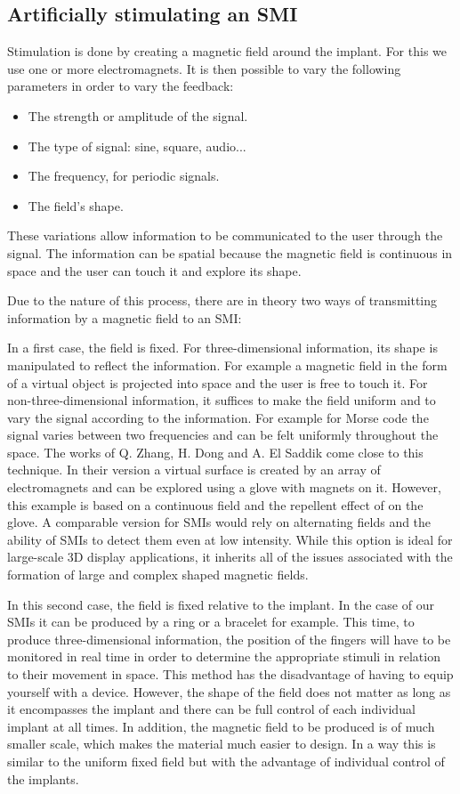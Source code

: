 \documentclass[10pt,journal,compsoc]{IEEEtran}
\begin{document}
\subsection{Artificially stimulating an SMI}
Stimulation is done by creating a magnetic field around the implant. For this we use one or more electromagnets. It is then possible to vary the following parameters in order to vary the feedback:
	
	\begin{itemize}
		\item The strength or amplitude of the signal.
		\item The type of signal: sine, square, audio...
		\item The frequency, for periodic signals.
		\item The field's shape.
	\end{itemize}
	
These variations allow information to be communicated to the user through the signal. The information can be spatial because the magnetic field is continuous in space and the user can touch it and explore its shape.

Due to the nature of this process, there are in theory two ways of transmitting information by a magnetic field to an SMI:

In a first case, the field is fixed. For three-dimensional information, its shape is manipulated to reflect the information. For example a magnetic field in the form of a virtual object is projected into space and the user is free to touch it.
For non-three-dimensional information, it suffices to make the field uniform and to vary the signal according to the information. For example for Morse code the signal varies between two frequencies and can be felt uniformly throughout the space.
The works of Q. Zhang, H. Dong and A. El Saddik \cite{zhang2016ieee} come close to this technique. In their version a virtual surface is created by an array of electromagnets and can be explored using a glove with magnets on it. However, this example is based on a continuous field and the repellent effect of on the glove. A comparable version for SMIs would rely on alternating fields and the ability of SMIs to detect them even at low intensity.
While this option is ideal for large-scale 3D display applications, it inherits all of the issues associated with the formation of large and complex shaped magnetic fields.

In this second case, the field is fixed relative to the implant. In the case of our SMIs it can be produced by a ring or a bracelet for example. This time, to produce three-dimensional information, the position of the fingers will have to be monitored in real time in order to determine the appropriate stimuli in relation to their movement in space. This method has the disadvantage of having to equip yourself with a device. However, the shape of the field does not matter as long as it encompasses the implant and there can be full control of each individual implant at all times. In addition, the magnetic field to be produced is of much smaller scale, which makes the material much easier to design. In a way this is similar to the uniform fixed field but with the advantage of individual control of the implants.
\end{document}
